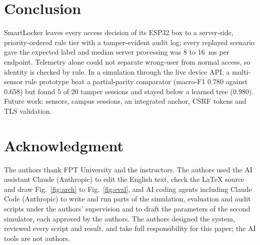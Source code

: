 \documentclass[journal,onecolumn]{IEEEtran}
\begin{document}
\section{Conclusion}

SmartLocker leaves every access decision of its ESP32 box to a server-side, priority-ordered rule tier with a
tamper-evident audit log; every replayed scenario gave the expected label and median server processing was 8 to
16~ms per endpoint. Telemetry alone could not separate wrong-user from normal access, so identity is checked by rule.
In a simulation through the live device API, a multi-sensor rule prototype beat a partial-parity comparator (macro-F1
0.780 against 0.658) but found 5 of 20 tamper sessions and stayed below a learned tree (0.980). Future work: sensors,
campus sessions, an integrated anchor, CSRF tokens and TLS validation.

\section*{Acknowledgment}

The authors thank FPT University and the instructors. The authors used the AI assistant Claude (Anthropic) to edit
the English text, check the \LaTeX{} source and draw Fig.~\ref{fig:arch} to Fig.~\ref{fig:eval}, and AI coding
agents including Claude Code (Anthropic) to write and run parts of the simulation, evaluation and audit scripts under
the authors' supervision and to draft the parameters of the second simulator, each approved by the authors. The
authors designed the system, reviewed every script and result, and take full responsibility for this paper; the AI
tools are not authors.
\end{document}
